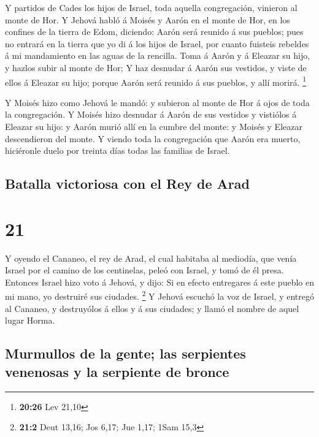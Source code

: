  Y partidos de Cades los hijos de Israel, toda aquella
congregación, vinieron al monte de Hor.  Y Jehová habló á
Moisés y Aarón en el monte de Hor, en los confines de la tierra de Edom,
diciendo:  Aarón será reunido á sus pueblos; pues no
entrará en la tierra que yo di á los hijos de Israel, por cuanto
fuisteis rebeldes á mi mandamiento en las aguas de la rencilla.
 Toma á Aarón y á Eleazar su hijo, y hazlos subir al monte
de Hor;  Y haz desnudar á Aarón sus vestidos, y viste de
ellos á Eleazar su hijo; porque Aarón será reunido á sus pueblos, y allí
morirá. \footnote{\textbf{20:26} Lev 21,10}

 Y Moisés hizo como Jehová le mandó: y subieron al monte de
Hor á ojos de toda la congregación.  Y Moisés hizo desnudar
á Aarón de sus vestidos y vistiólos á Eleazar su hijo: y Aarón murió
allí en la cumbre del monte: y Moisés y Eleazar descendieron del monte.
 Y viendo toda la congregación que Aarón era muerto,
hiciéronle duelo por treinta días todas las familias de Israel.

\hypertarget{batalla-victoriosa-con-el-rey-de-arad}{%
\subsection{Batalla victoriosa con el Rey de
Arad}\label{batalla-victoriosa-con-el-rey-de-arad}}

\hypertarget{section-20}{%
\section{21}\label{section-20}}

 Y oyendo el Cananeo, el rey de Arad, el cual habitaba al
mediodía, que venía Israel por el camino de los centinelas, peleó con
Israel, y tomó de él presa.  Entonces Israel hizo voto á
Jehová, y dijo: Si en efecto entregares á este pueblo en mi mano, yo
destruiré sus ciudades. \footnote{\textbf{21:2} Deut 13,16; Jos 6,17;
  Jue 1,17; 1Sam 15,3}  Y Jehová escuchó la voz de Israel, y
entregó al Cananeo, y destruyólos á ellos y á sus ciudades; y llamó el
nombre de aquel lugar Horma.

\hypertarget{murmullos-de-la-gente-las-serpientes-venenosas-y-la-serpiente-de-bronce}{%
\subsection{Murmullos de la gente; las serpientes venenosas y la
serpiente de
bronce}\label{murmullos-de-la-gente-las-serpientes-venenosas-y-la-serpiente-de-bronce}}

